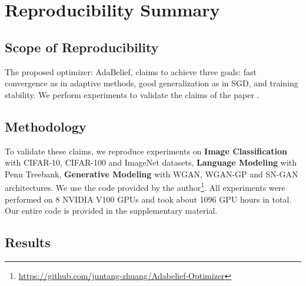 \section*{\centering Reproducibility Summary}


\subsection*{Scope of Reproducibility}

The proposed optimizer: AdaBelief, claims to achieve three goals: fast convergence as in adaptive methods, good generalization as in SGD, and training stability. We perform experiments to validate the claims of the paper \cite{zhuang_adabelief_2020}.

\subsection*{Methodology}

To validate these claims, we reproduce experiments on \textbf{Image Classification} with CIFAR-10, CIFAR-100 and ImageNet datasets, \textbf{Language Modeling} with Penn Treebank, \textbf{Generative Modeling} with WGAN, WGAN-GP and SN-GAN architectures. We use the code provided by the author\footnote{\href{https://github.com/juntang-zhuang/Adabelief-Optimizer}{https://github.com/juntang-zhuang/Adabelief-Optimizer}}. All experiments were performed on 8 NVIDIA V100 GPUs and took about 1096 GPU hours in total. Our entire code is provided in the supplementary material.


\subsection*{Results}

